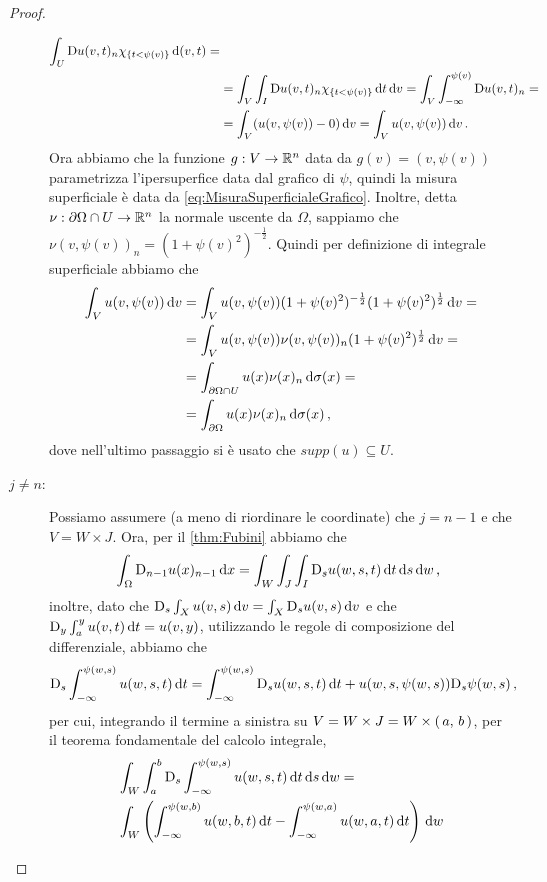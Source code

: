 \begin{proof}
\begin{description}
\begin{align*}
				\int_{U} \mathrm D u(v,t)_n \chi_{\{t<\psi(v)\}} \,\mathrm d (v,t) = \\
				& = \int_V \int_I \mathrm D u(v,t)_n \chi_{\{t<\psi(v)\}} \,\mathrm d t \,\mathrm d v = \int_V \int_{-\infty}^{\psi(v)} \mathrm D u(v,t)_n = \\
				& = \int_V (u(v,\psi(v)) - 0) \,\mathrm d v = \int_V u(v,\psi(v)) \,\mathrm d v\, \text{. }
			\end{align*}
			Ora abbiamo che la funzione $g:V\rightarrow \mathbb R^n$ data da $g(v)=(v,\psi(v))$ parametrizza l'ipersuperfice data dal grafico di
			$\psi$, quindi la misura superficiale è data da \cref{eq:MisuraSuperficialeGrafico}.
			Inoltre, detta $\nu:\partial \Omega \cap U \rightarrow \mathbb R^n$ la normale uscente da $\Omega$, sappiamo che
			$\nu(v,\psi(v))_n=(1+\psi(v)^2)^{-\frac{1}{2}}$. Quindi per definizione di integrale superficiale abbiamo che
			\begin{align*}
				\int_V u(v,\psi(v)) \,\mathrm d v &= \int_V u(v,\psi(v)) (1+\psi(v)^2)^{-\frac{1}{2}} (1+\psi(v)^2)^{\frac{1}{2}} \,\mathrm d v = \\
				& = \int_V u(v,\psi(v)) \nu(v,\psi(v))_n (1+\psi(v)^2)^{\frac{1}{2}} \,\mathrm d v = \\
				& = \int_{\partial \Omega \cap U} u(x) \nu(x)_n \,\mathrm d \sigma(x) = \\
				& = \int_{\partial \Omega} u(x) \nu(x)_n \,\mathrm d \sigma(x)\, \text{, }
			\end{align*}
			dove nell'ultimo passaggio si è usato che $supp(u)\subseteq U$.
		\item [$j\neq n$:] Possiamo assumere (a meno di riordinare le coordinate) che $j=n-1$ e che $V=W \times J$. Ora, per il
			\cref{thm:Fubini} abbiamo che
			\[
				\int_{\Omega} \mathrm D_{n-1} u(x)_{n-1} \,\mathrm d x = \int_W \int_J \int_I \mathrm D_s u(w,s,t) \,\mathrm d t \,\mathrm d s \,\mathrm d w\, \text{, }
			\]
			inoltre, dato che $\mathrm D_s \int_X u(v,s)\,\mathrm d v = \int_X \mathrm D_s u(v,s)\,\mathrm d v$ e che $\mathrm D_y \int_a^y u(v,t)\,\mathrm d t=u(v,y)$,
			utilizzando le regole di composizione del differenziale, abbiamo che
			\[
				\mathrm D_s \int_{-\infty}^{\psi(w,s)} u(w,s,t) \,\mathrm d t =
				\int_{-\infty}^{\psi(w,s)} \mathrm D_s u(w,s,t) \,\mathrm d t + u(w,s,\psi(w,s))\mathrm D_s \psi (w,s)\, \text{, }
			\]
			per cui, integrando il termine a sinistra su $V=W\times J=W\times \left(\,a,\,b\,\right)$, per il teorema fondamentale del
			calcolo integrale,
			\begin{align*}
				&\int_W \int_a^b \Diff_s \int_{-\infty}^{\psi(w,s)} u(w,s,t) \de t \de s \de w = \\
				&\int_W \left(\int_{-\infty}^{\psi(w,b)} u(w,b,t) \de t - \int_{-\infty}^{\psi(w,a)} u(w,a,t) \de t\right) \de w

\end{align*}
\end{description}
\end{proof}
